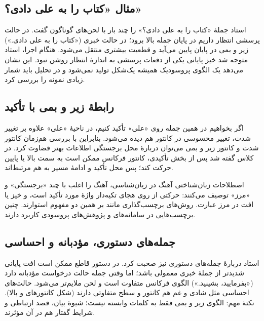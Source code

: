 
\subsection{مثال «کتاب را به علی دادی؟»}
استاد جملهٔ «کتاب را به علی دادی؟» را چند بار با لحن‌های گوناگون گفت. در حالت پرسشی انتظار داریم  در پایان جمله بالا برود؛ در حالت خبری («کتاب را به علی دادی.») زیر و بمی در پایان پایین می‌آید و قطعیت بیشتری منتقل می‌شود. هنگام اجرا، استاد متوجه شد خیز پایانی یکی از دفعات پرسشی به اندازهٔ انتظار روشن نبود. این نشان می‌دهد یک الگوی پروسودیک همیشه یک‌شکل تولید نمی‌شود و در تحلیل باید شمار زیادی نمونه را بررسی کرد.

\subsection{رابطهٔ زیر و بمی با تأکید}
اگر بخواهیم در همین جمله روی «علی» تأکید کنیم، در ناحیهٔ «علی» علاوه بر تغییر شدت، تغییر محسوسی در کانتور  هم دیده می‌شود. بنابراین با بررسی هم‌زمان کانتور شدت و کانتور زیر و بمی می‌توان دربارهٔ محل برجستگی اطلاعات بهتر قضاوت کرد. در کلاس گفته شد پس از بخش تأکیدی، کانتور فرکانس ممکن است به سمت بالا یا پایین حرکت کند؛ پس محل تأکید و ادامهٔ مسیر  به هم مرتبط‌اند.

\begin{addedbox}{اصطلاحات زبان‌شناختی آهنگ}
در زبان‌شناسی، آهنگ را اغلب با چند «برجستگی» و «مرز» توصیف می‌کنند:  حرکتی از  روی هجای تکیه‌دار واژهٔ مورد تأکید است، و  خیز یا افت در مرز عبارت. روش‌های برچسب‌گذاری مانند  بر همین دو مفهوم استوارند. چنین برچسب‌هایی در سامانه‌های  و پژوهش‌های پروسودی کاربرد دارند.
\end{addedbox}

\subsection{جمله‌های دستوری، مؤدبانه و احساسی}
استاد دربارهٔ جمله‌های دستوری نیز صحبت کرد. در دستور قاطع ممکن است افت پایانی شدیدتر از جملهٔ خبری معمولی باشد؛ اما وقتی جمله حالت درخواست مؤدبانه دارد («بفرمایید، بشینید.») الگوی فرکانس متفاوت است و لحن ملایم‌تر می‌شود. حالت‌های احساسی مثل شادی و غم هم کانتور و سطح متفاوتی دارند (شکل کانتورهای  و  بالا). نکتهٔ مهم: الگوی زیر و بمی فقط به کلمات وابسته نیست؛ شیوهٔ بیان، قصد ارتباطی و شرایط گفتار هم در آن مؤثرند.

